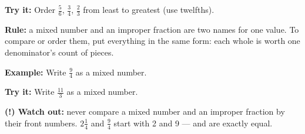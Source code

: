\documentclass[12pt]{article}
\begin{document}
\begin{tryitbox}
\textbf{Try it:} \quad Order $\tfrac{5}{6}$, $\tfrac{3}{4}$, $\tfrac{2}{3}$
from least to greatest (use twelfths).\\[2pt]
\end{tryitbox}


\begin{formulabox}
\textbf{Rule:} a mixed number and an improper fraction are two names for one
value. To compare or order them, put everything in the same form: each whole
is worth one denominator's count of pieces.
\end{formulabox}

\begin{examplebox}
\textbf{Example:} \quad Write $\tfrac{9}{4}$ as a mixed number.
\end{examplebox}

\begin{tryitbox}
\textbf{Try it:} \quad Write $\tfrac{11}{3}$ as a mixed number.\\[2pt]
\end{tryitbox}

\begin{watchoutbox}
\textbf{(!) Watch out:} never compare a mixed number and an improper
fraction by their front numbers. $2\tfrac{1}{4}$ and $\tfrac{9}{4}$ start
with 2 and 9 --- and are exactly equal.
\end{watchoutbox}
\end{document}
